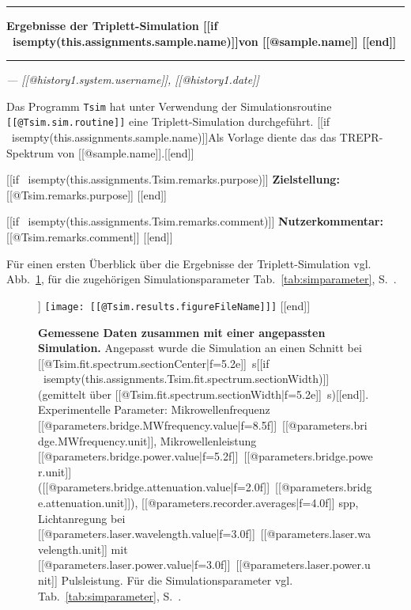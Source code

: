 \documentclass{article}
\begin{document}
\thispagestyle{empty}

\vspace*{-1.5cm}

\noindent\rule[1.5ex]{\textwidth}{1pt}

\begin{sffamily}\bfseries\large
Ergebnisse der Triplett-Simulation [[if ~isempty(this.assignments.sample.name)]]von [[@sample.name]] [[end]]
\end{sffamily}

\noindent\rule{\textwidth}{1pt}

\begin{flushright}\slshape
--- [[@history{1}.system.username]], [[@history{1}.date]]
\end{flushright}

\vspace*{1.5em}

Das Programm \texttt{Tsim} hat unter Verwendung der Simulationsroutine \texttt{[[@Tsim.sim.routine]]} eine Triplett-Simulation durchgeführt.
[[if ~isempty(this.assignments.sample.name)]]Als Vorlage diente das das TREPR-Spektrum von [[@sample.name]].[[end]]

[[if ~isempty(this.assignments.Tsim.remarks.purpose)]]
\textbf{Zielstellung:} [[@Tsim.remarks.purpose]]
[[end]]

[[if ~isempty(this.assignments.Tsim.remarks.comment)]]
\textbf{Nutzerkommentar:} [[@Tsim.remarks.comment]]
[[end]]

Für einen ersten Überblick über die Ergebnisse der Triplett-Simulation vgl. Abb.~\ref{fig:ergebnisse}, für die zugehörigen Simulationsparameter Tab.~\ref{tab:simparameter}, S.~\pageref{tab:simparameter}.


\begin{figure}[h]
\centering
[[if ~isempty(this.assignments.Tsim.results.figureFileName)]]
\texttt{[image: [[@Tsim.results.figureFileName]]]}
[[end]]
\caption{\textbf{Gemessene Daten zusammen mit einer angepassten Simulation.} Angepasst wurde die Simulation an einen Schnitt bei [[@Tsim.fit.spectrum.sectionCenter|f=5.2e]]~s[[if ~isempty(this.assignments.Tsim.fit.spectrum.sectionWidth)]] (gemittelt über [[@Tsim.fit.spectrum.sectionWidth|f=5.2e]]~s)[[end]]. Experimentelle Parameter: Mikrowellenfrequenz [[@parameters.bridge.MWfrequency.value|f=8.5f]]~[[@parameters.bridge.MWfrequency.unit]], Mikrowellenleistung [[@parameters.bridge.power.value|f=5.2f]]~[[@parameters.bridge.power.unit]] ([[@parameters.bridge.attenuation.value|f=2.0f]]~[[@parameters.bridge.attenuation.unit]]), [[@parameters.recorder.averages|f=4.0f]] spp, Lichtanregung bei [[@parameters.laser.wavelength.value|f=3.0f]]~[[@parameters.laser.wavelength.unit]] mit [[@parameters.laser.power.value|f=3.0f]]~[[@parameters.laser.power.unit]] Pulsleistung. Für die Simulationsparameter vgl. Tab.~\ref{tab:simparameter}, S.~\pageref{tab:simparameter}.}
\label{fig:ergebnisse}
\end{figure}
\end{document}
